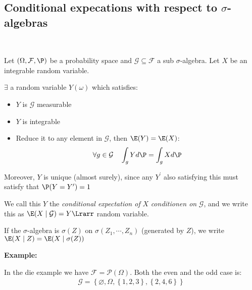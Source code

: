 \subsection{Conditional expecations with respect to $\sigma$-algebras}\hfill\\
\begin{defo}{}
  Let $(\Omega,\mathcal{F},\P)$ be a probability space and $\mathcal{G}\subseteq\mathcal{F}$ a sub $\sigma$-algebra. Let $X$ be an integrable random variable.\par
  \noindent $\exists$ a random variable $Y(\omega)$ which satisfies:\par
  \begin{itemize}
    \item$Y$ is $\mathcal{G}$ measurable
    \item $Y$ is integrable
    \item Reduce it to any element in $\mathcal{G}$, then $\E(Y) = \E(X)$:
      \begin{equation*}
        \begin{gathered}
          \forall g\in\mathcal{G}\quad \int_g Yd\P = \int_g Xd\P
        \end{gathered}
      \end{equation*}
  \end{itemize}\par
  \noindent Moreover, $Y$ is unique (almost surely), since any $Y^{\prime}$ also satisfying this must satisfy that $\P(Y=Y^{\prime}) = 1$
  \par\bigskip
  \noindent We call this $Y$ the \textit{conditional expectation of } $X$ \textit{conditionen on } $\mathcal{G}$, and we write this as $\E(X\mid \mathcal{G}) = Y\Lrarr$ random variable.
\end{defo}
\par\bigskip
\noindent If the $\sigma$-algebra is $\sigma(Z)$ on $\sigma(Z_1,\cdots,Z_n)$ (generated by $Z$), we write $\E(X\mid Z) = \E(X\mid\sigma(Z))$
\par\bigskip
\noindent\textbf{Example:}\par
\noindent In the die example we have $\mathcal{F} = \mathcal{P}(\Omega)$. Both the even and the odd case is:
\begin{equation*}
  \begin{gathered}
  \mathcal{G} = \left\{\varnothing,\Omega,\left\{1,2,3\right\},\left\{2,4,6\right\}\right\}
  \end{gathered}
\end{equation*}\par
